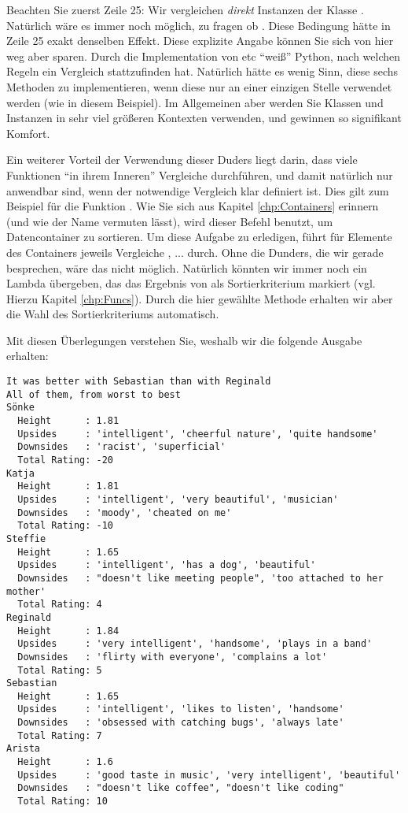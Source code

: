 Beachten Sie zuerst Zeile 25: Wir vergleichen \emph{direkt} Instanzen der Klasse . Natürlich wäre es immer noch möglich, zu fragen ob . Diese Bedingung hätte in Zeile 25 exakt denselben Effekt. Diese explizite Angabe können Sie sich von hier weg aber sparen. Durch die Implementation von  etc \enquote{weiß} Python, nach welchen Regeln ein Vergleich stattzufinden hat. Natürlich hätte es wenig Sinn, diese sechs Methoden zu implementieren, wenn diese nur an einer einzigen Stelle verwendet werden (wie in diesem Beispiel). Im Allgemeinen aber werden Sie Klassen und Instanzen in sehr viel größeren Kontexten verwenden, und gewinnen so signifikant Komfort.

Ein weiterer Vorteil der Verwendung dieser Duders liegt darin, dass viele Funktionen \enquote{in ihrem Inneren} Vergleiche durchführen, und damit natürlich nur anwendbar sind, wenn der notwendige Vergleich klar definiert ist. Dies gilt zum Beispiel für die Funktion . Wie Sie sich aus Kapitel \ref{chp:Containers} erinnern (und wie der Name vermuten lässt), wird dieser Befehl benutzt, um Datencontainer zu sortieren. Um diese Aufgabe zu erledigen, führt  für Elemente  des Containers jeweils Vergleiche , ... durch. Ohne die Dunders, die wir gerade besprechen, wäre das nicht möglich. Natürlich könnten wir immer noch ein Lambda übergeben, das das Ergebnis von  als Sortierkriterium markiert (vgl. Hierzu Kapitel \ref{chp:Funcs}). Durch die hier gewählte Methode erhalten wir aber die Wahl des Sortierkriteriums automatisch.

Mit diesen Überlegungen verstehen Sie, weshalb wir die folgende Ausgabe erhalten:

\begin{cmdbox}
\begin{verbatim}
It was better with Sebastian than with Reginald
All of them, from worst to best
Sönke
  Height      : 1.81
  Upsides     : 'intelligent', 'cheerful nature', 'quite handsome'
  Downsides   : 'racist', 'superficial'
  Total Rating: -20
Katja
  Height      : 1.81
  Upsides     : 'intelligent', 'very beautiful', 'musician'
  Downsides   : 'moody', 'cheated on me'
  Total Rating: -10
Steffie
  Height      : 1.65
  Upsides     : 'intelligent', 'has a dog', 'beautiful'
  Downsides   : "doesn't like meeting people", 'too attached to her mother'
  Total Rating: 4
Reginald
  Height      : 1.84
  Upsides     : 'very intelligent', 'handsome', 'plays in a band'
  Downsides   : 'flirty with everyone', 'complains a lot'
  Total Rating: 5
Sebastian
  Height      : 1.65
  Upsides     : 'intelligent', 'likes to listen', 'handsome'
  Downsides   : 'obsessed with catching bugs', 'always late'
  Total Rating: 7
Arista
  Height      : 1.6
  Upsides     : 'good taste in music', 'very intelligent', 'beautiful'
  Downsides   : "doesn't like coffee", "doesn't like coding"
  Total Rating: 10
\end{verbatim}
\end{cmdbox}


